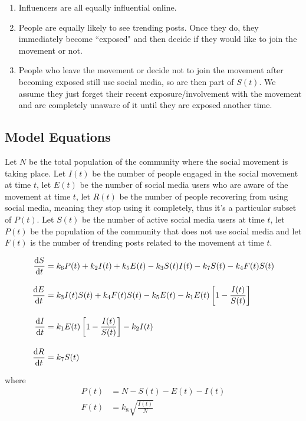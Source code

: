 \documentclass{article}
\begin{document}
\begin{enumerate}
    \item Influencers are all equally influential online.

    \item People are equally likely to see trending posts. Once they do, they immediately become ``exposed" and then decide if they would like to join the movement or not. 
    
    \item People who leave the movement or decide not to join the movement after becoming exposed still use social media, so are then part of $S(t)$. We assume they just forget their recent exposure/involvement with the movement and are completely unaware of it until they are exposed another time. 
    
    \end{enumerate}
    \subsection{Model Equations}
     Let $N$ be the total population of the community where the social movement is taking place.
     Let $I(t)$ be the number of people engaged in the social movement at time $t$, let $E(t)$ be the number of social media users who are aware of the movement at time $t$, let $R(t)$ be the number of people recovering from using social media, meaning they stop using it completely, thus it's a particular subset of $P(t)$. Let $S(t)$ be the number of active social media users at time $t$, let $P(t)$ be the population of the community that does not use social media and let $F(t)$ is the number of trending posts related to the movement at time $t$.
    
    \begin{subequations}
    \begin{align}            
        \diff St &= k_6 P(t) + k_2I(t) + k_5E(t) - k_3 {S(t)I(t)}- k_7S(t)-k_4 F(t)S(t)\label{eq:main_s}
        \\[10pt]
        \diff Et &= k_3 I(t)S(t) + k_4 F(t) S(t) - k_5E(t) - k_1E(t)\left[1 - \frac{I(t)}{S(t)}\right] \label{eq:main_e}
        \\[10pt]
        \diff It &= k_1 E(t) \left[1 - \frac{I(t)}{S(t)}\right] - k_2I(t)\label{eq:main_i}
        \\[10pt]
        \diff Rt &= k_7S(t) \label{eq:main_r}
    \end{align}
    \label{meq_main}
    \end{subequations}
    
    where
    \begin{subequations}
    \begin{align}
        P(t) &= N - S(t) - E(t) - I(t)
        \\[10pt]
        F(t) &= k_8\sqrt{\frac{I(t)} N}
    \end{align}
    \end{subequations}
\end{document}
